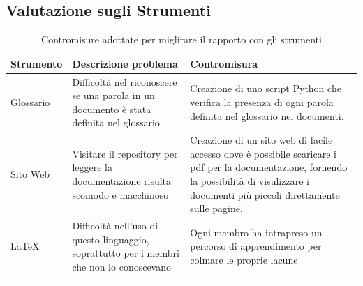 \documentclass{article}
\begin{document}
\subsection{Valutazione sugli Strumenti}
\begin{center}
    \begin{longtable}{|>{\centering\arraybackslash}p{}|>{\centering\arraybackslash}p{}|>{\centering\arraybackslash}p{}|}
        \hline
        \textbf{Strumento} & \textbf{Descrizione problema} & \textbf{Contromisura} \\
        \hline
        Glossario & Difficoltà nel riconoscere se una parola in un documento è stata definita nel glossario & Creazione di uno script Python che verifica la presenza di ogni parola definita nel glossario nei documenti.\\
        \hline
        Sito Web & Visitare il repository per leggere la documentazione risulta scomodo e macchinoso & Creazione di un sito web di facile accesso dove è possibile scaricare i pdf per la documentazione, fornendo la possibilità di visulizzare i documenti più piccoli direttamente sulle pagine. \\
        \hline
        LaTeX & Difficoltà nell'uso di questo linguaggio, soprattutto per i membri che non lo conoscevano & Ogni membro ha intrapreso un percorso di apprendimento per colmare le proprie lacune \\
        \hline %
        \caption{Contromisure adottate per miglirare il rapporto con gli strumenti}
    \end{longtable}
\end{center}
\end{document}
